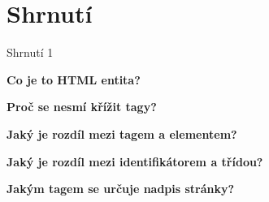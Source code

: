 \documentclass[aspectratio=1610]{beamer}
\begin{document}
\section{Shrnutí}
\begin{frame}{Shrnutí 1}
    \begin{cardTiny}
        \begin{center}
            \textbf{Co je to HTML entita?}
        \end{center}
    \end{cardTiny}
    \begin{cardTiny}
        \begin{center}
            \textbf{Proč se nesmí křížit tagy?}
        \end{center}
    \end{cardTiny}
    \begin{cardTiny}
        \begin{center}
            \textbf{Jaký je rozdíl mezi tagem a elementem?}
        \end{center}
    \end{cardTiny}
    \begin{cardTiny}
        \begin{center}
            \textbf{Jaký je rozdíl mezi identifikátorem a třídou?}
        \end{center}
    \end{cardTiny}
    \begin{cardTiny}
        \begin{center}
            \textbf{Jakým tagem se určuje nadpis stránky?}
        \end{center}
    \end{cardTiny}
\end{frame}
\end{document}
